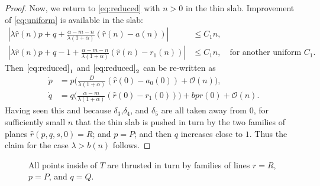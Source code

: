 \documentclass[a4paper,11pt]{article}
\begin{document}
{\begin{proof}
Now, we return to \eqref{eq:reduced} with $n>0$ in the thin slab. Improvement of \eqref{eq:uniform} is available in the slab:
\begin{equation} \label{eq:uniform2}
 \begin{aligned}
 \left|\lambda \hat{r}(n)p + q + \frac{\alpha-m-n}{\lambda(1+\alpha)}(\hat{r}(n)-a(n)) \right| &\le C_1n,\\
   \left|\lambda \hat{r}(n)p + q-1 + \frac{\alpha-m-n}{\lambda(1+\alpha)}(\hat{r}(n)-r_1(n)) \right|&\le  C_1n, \quad \text{for another uniform $C_1$}.
 \end{aligned}
\end{equation}
Then $\eqref{eq:reduced}_1$ and $\eqref{eq:reduced}_2$ can be re-written as
\begin{equation} \label{eq:reduced_slab}
\begin{aligned}
 \dot{p} &= p\big(\frac{D}{\lambda(1+\alpha)}(\hat{r}(0)-a_0(0)) + \mathcal{O}(n)\big),\\
 \dot{q} &= q\big(\frac{\alpha-m}{\lambda(1+\alpha)}(\hat{r}(0)-r_1(0))\big) + bp\hat{r}(0) + \mathcal{O}(n).
\end{aligned}
\end{equation}
Having seen this and because $\delta_3$,$\delta_4$, and $\delta_5$ are all taken away from $0$, for sufficiently small $n$ that the thin slab is pushed  in turn by the two families of planes $\hat{r}(p,q,s,0)=R$; and $p=P$; and then $q$ increases close to $1$. Thus the claim for the case $\lambda > b(n)$ follows.
\end{proof}
\begin{figure}
 \centering
  \subfigure[r=R family]{
  \psfrag{r}{\scriptsize$r$}%
  \texttt{[image: push\_a.eps]}\label{fig:eq1}
  }
  \quad 
  \subfigure[p=P family]{
  \psfrag{r}{\scriptsize$s-\frac{1+m}{1+\alpha}$}%
  \texttt{[image: push\_b.eps]}\label{fig:eq2}
  }
  \subfigure[q=Q family]{
  \psfrag{r}{\scriptsize$s-\frac{1+m}{1+\alpha}$}%
  \texttt{[image: push\_c.eps]}\label{fig:eq2}
  }
  \caption{All points inside of $T$ are thrusted in turn by families of lines $r=R$, $p=P$, and $q=Q$.} \label{fig:equilibria} 
\end{figure}


}
\end{document}
